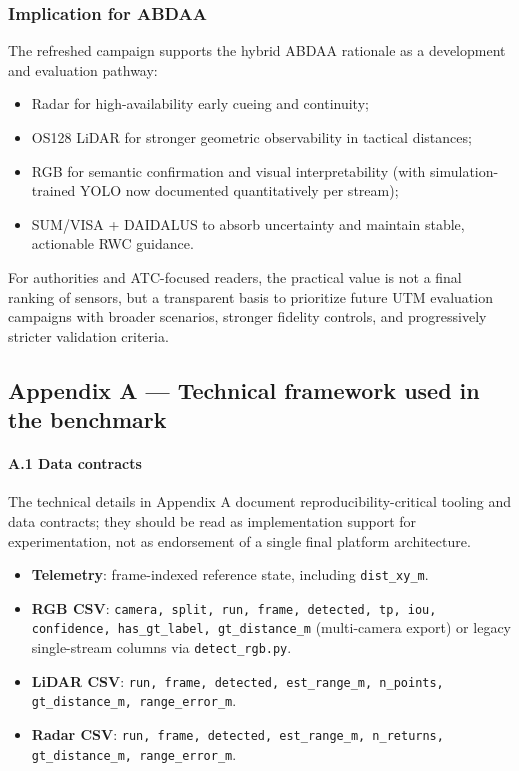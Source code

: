 \subsubsection{Implication for ABDAA}
The refreshed campaign supports the hybrid ABDAA rationale as a development and evaluation pathway:
\begin{itemize}
  \item Radar for high-availability early cueing and continuity;
  \item OS128 LiDAR for stronger geometric observability in tactical distances;
  \item RGB for semantic confirmation and visual interpretability (with simulation-trained YOLO now documented quantitatively per stream);
  \item SUM/VISA + DAIDALUS to absorb uncertainty and maintain stable, actionable RWC guidance.
\end{itemize}
For authorities and ATC-focused readers, the practical value is not a final ranking of sensors, but a transparent basis to prioritize future UTM evaluation campaigns with broader scenarios, stronger fidelity controls, and progressively stricter validation criteria.

\subsection*{Appendix A --- Technical framework used in the benchmark}
\label{app:technical-framework}

\paragraph{A.1 Data contracts}
The technical details in Appendix A document reproducibility-critical tooling and data contracts; they should be read as implementation support for experimentation, not as endorsement of a single final platform architecture.
\begin{itemize}
  \item \textbf{Telemetry}: frame-indexed reference state, including \texttt{dist\_xy\_m}.
  \item \textbf{RGB CSV}: \texttt{camera, split, run, frame, detected, tp, iou, confidence, has\_gt\_label, gt\_distance\_m} (multi-camera export) or legacy single-stream columns via \texttt{detect\_rgb.py}.
  \item \textbf{LiDAR CSV}: \texttt{run, frame, detected, est\_range\_m, n\_points, gt\_distance\_m, range\_error\_m}.
  \item \textbf{Radar CSV}: \texttt{run, frame, detected, est\_range\_m, n\_returns, gt\_distance\_m, range\_error\_m}.
\end{itemize}

